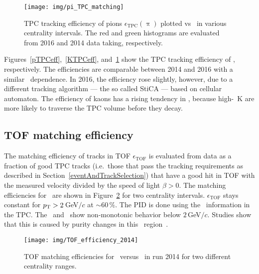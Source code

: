 \begin{figure}[!htb]
\centering
\vspace{-0.2cm}
\texttt{[image: img/pi\_TPC\_matching]}
\vspace{-0.8cm}
\caption[TPC tracking efficiency of pions.]{\label{piTPCeff} TPC tracking efficiency of pions $\epsilon_\mathrm{TPC}(\uppi)$ plotted vs \pt\ in various centrality intervals. The red and green histograms are evaluated from 2016 and 2014 data taking, respectively.}

\end{figure}

Figures~\ref{pTPCeff},~\ref{KTPCeff}, and~\ref{piTPCeff} show the TPC tracking efficiency of \pKandpi, respectively. The efficiencies are comparable between 2014 and 2016 with a similar \pt\ dependence. In 2016, the efficiency rose slightly, however, due to a different tracking algorithm --- the so called StiCA --- based on cellular automaton. The efficiency of kaons has a rising tendency in \pt, because high-\pt\ K are more likely to traverse the TPC volume before they decay.

\subsection{TOF matching efficiency\label{tofEff}}

The matching efficiency of tracks in TOF $\epsilon_\mathrm{TOF}$ is evaluated from data as a fraction of good TPC tracks (i.e.\ those that pass the tracking requirements as described in Section~\ref{eventAndTrackSelection}) that have a good hit in TOF with the measured velocity divided by the speed of light $\beta > 0$\@. The matching efficiencies for \pKandpi\ are shown in Figure~\ref{tof2014} for two centrality intervals. $\epsilon_\mathrm{TOF}$ stays constant for ${p_{\mathrm{T}}} > 2\,$GeV$/c$ at $\sim60\,\%$\@. The PID is done using the \dedx\ information in the TPC\@. The \ppm\ and \Kmp\ show non-monotonic behavior below $2\,$GeV$/c$. Studies show that this is caused by purity changes in this \pt\ region~\cite{D0paper}\@. 

\begin{figure}[!htb]
\centering
\vspace{-0.2cm}
\texttt{[image: img/TOF\_efficiency\_2014]}
\vspace{-0.8cm}
\caption[TOF matching efficiencies for \pKandpi\ versus \pt\ in run 2014.]{\label{tof2014} TOF matching efficiencies for \pKandpi\ versus \pt\ in run 2014 for two different centrality ranges.}
\end{figure}

